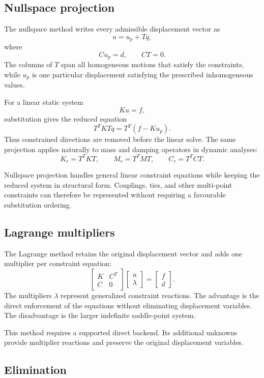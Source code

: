 \subsection*{Nullspace projection}

The nullspace method writes every admissible displacement vector as
\[
u=u_p+Tq,
\]
where
\[
Cu_p=d,\qquad CT=0.
\]
The columns of \(T\) span all homogeneous motions that satisfy the constraints, while \(u_p\) is one particular displacement satisfying the prescribed inhomogeneous values.

For a linear static system
\[
Ku=f,
\]
substitution gives the reduced equation
\[
T^TKTq=T^T(f-Ku_p).
\]
Thus constrained directions are removed before the linear solve. The same projection applies naturally to mass and damping operators in dynamic analyses:
\[
K_r=T^TKT,\qquad
M_r=T^TMT,\qquad
C_r=T^TCT.
\]

Nullspace projection handles general linear constraint equations while keeping the reduced system in structural form. Couplings, ties, and other multi-point constraints can therefore be represented without requiring a favourable substitution ordering.

\subsection*{Lagrange multipliers}

The Lagrange method retains the original displacement vector and adds one multiplier per constraint equation:
\[
\begin{bmatrix}
K&C^T\\
C&0
\end{bmatrix}
\begin{bmatrix}u\\\lambda\end{bmatrix}
=
\begin{bmatrix}f\\d\end{bmatrix}.
\]
The multipliers \(\lambda\) represent generalized constraint reactions. The advantage is the direct enforcement of the equations without eliminating displacement variables. The disadvantage is the larger indefinite saddle-point system.

This method requires a supported direct backend. Its additional unknowns provide multiplier reactions and preserve the original displacement variables.

\subsection*{Elimination}

